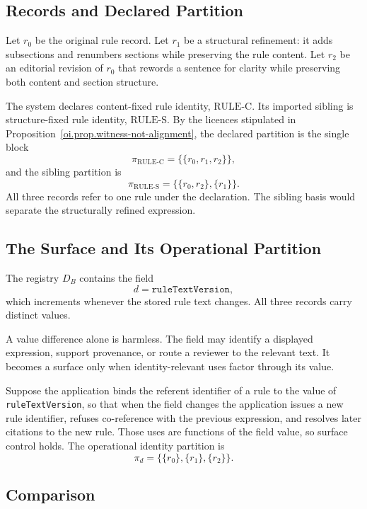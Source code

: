 \documentclass[11pt]{article}
\theoremstyle{plain}
\theoremstyle{definition}
\theoremstyle{remark}
\newcommand{\RULEC}{\ensuremath{\mathrm{RULE\text{-}C}}}
\newcommand{\RULES}{\ensuremath{\mathrm{RULE\text{-}S}}}
\begin{document}
\subsection{Records and Declared Partition}

Let \(r_0\) be the original rule record.
Let \(r_1\) be a structural refinement:
it adds subsections and renumbers sections
while preserving the rule content.
Let \(r_2\) be an editorial revision of \(r_0\)
that rewords a sentence for clarity
while preserving both content and section structure.

The system declares content-fixed rule identity, \(\RULEC\).
Its imported sibling is structure-fixed rule identity, \(\RULES\).
By the licences stipulated in
Proposition~\ref{oi.prop.witness-not-alignment},
the declared partition is the single block
\[
  \pi_{\RULEC}
  =
  \bigl\{\{r_0,r_1,r_2\}\bigr\},
\]
and the sibling partition is
\[
  \pi_{\RULES}
  =
  \bigl\{\{r_0,r_2\},\{r_1\}\bigr\}.
\]
All three records refer to one rule under the declaration.
The sibling basis would separate the structurally refined expression.

\subsection{The Surface and Its Operational Partition}

The registry \(D_B\) contains the field
\[
  d=\texttt{ruleTextVersion},
\]
which increments whenever the stored rule text changes.
All three records carry distinct values.

A value difference alone is harmless.
The field may identify a displayed expression,
support provenance,
or route a reviewer to the relevant text.
It becomes a surface only when identity-relevant uses factor through its value.

Suppose the application binds the referent identifier of a rule
to the value of \texttt{ruleTextVersion},
so that when the field changes the application
issues a new rule identifier,
refuses co-reference with the previous expression,
and resolves later citations to the new rule.
Those uses are functions of the field value,
so surface control holds.
The operational identity partition is
\[
  \pi_d
  =
  \bigl\{\{r_0\},\{r_1\},\{r_2\}\bigr\}.
\]

\subsection{Comparison}
\end{document}
